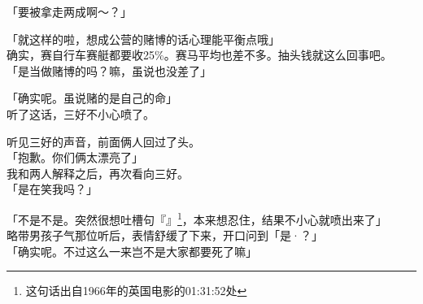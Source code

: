 「要被拿走两成啊～？」

「就这样的啦，想成公营的赌博的话心理能平衡点哦」\\

确实，赛自行车赛艇都要收25\%。赛马平均也差不多。抽头钱就这么回事吧。\\

「是当做赌博的吗？嘛，虽说也没差了」

「确实呢。虽说赌的是自己的命」\\

听了这话，三好不小心喷了。

听见三好的声音，前面俩人回过了头。\\

「抱歉。你们俩太漂亮了」\\

我和两人解释之后，再次看向三好。\\

「是在笑我吗？」

「不是不是。突然很想吐槽句『』\footnote{这句话出自1966年的英国电影的01:31:52处}，本来想忍住，结果不小心就喷出来了」\\

略带男孩子气那位听后，表情舒缓了下来，开口问到「是·？」\\

「确实呢。不过这么一来岂不是大家都要死了嘛」\\


